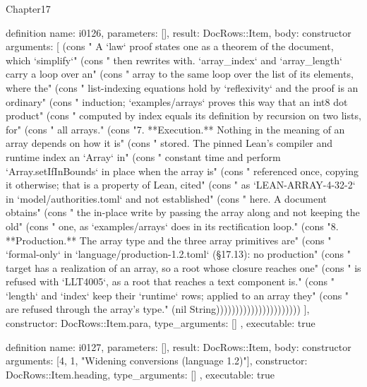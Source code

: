 \begin{lexlean}{Chapter17}
\begin{semanticmodule}
definition{
  name: i0126,
  parameters: [],
  result: DocRows::Item,
  body: constructor{
    arguments: [
      (cons "   A `law` proof states one as a theorem of the document, which `simplify`" (cons "   then rewrites with. `array_index` and `array_length` carry a loop over an" (cons "   array to the same loop over the list of its elements, where the" (cons "   list-indexing equations hold by `reflexivity` and the proof is an ordinary" (cons "   induction; `examples/arrays` proves this way that an int8 dot product" (cons "   computed by index equals its definition by recursion on two lists, for" (cons "   all arrays." (cons "7. **Execution.** Nothing in the meaning of an array depends on how it is" (cons "   stored. The pinned Lean's compiler and runtime index an `Array` in" (cons "   constant time and perform `Array.setIfInBounds` in place when the array is" (cons "   referenced once, copying it otherwise; that is a property of Lean, cited" (cons "   as `LEAN-ARRAY-4-32-2` in `model/authorities.toml` and not established" (cons "   here. A document obtains" (cons "   the in-place write by passing the array along and not keeping the old" (cons "   one, as `examples/arrays` does in its rectification loop." (cons "8. **Production.** The array type and the three array primitives are" (cons "   `formal-only` in `language/production-1.2.toml` (§17.13): no production" (cons "   target has a realization of an array, so a root whose closure reaches one" (cons "   is refused with `LLT4005`, as a root that reaches a text component is." (cons "   `length` and `index` keep their `runtime` rows; applied to an array they" (cons "   are refused through the array's type." (nil String))))))))))))))))))))))
    ],
    constructor: DocRows::Item.para,
    type_arguments: []
  },
  executable: true
}

definition{
  name: i0127,
  parameters: [],
  result: DocRows::Item,
  body: constructor{
    arguments: [4, 1, "Widening conversions (language 1.2)"],
    constructor: DocRows::Item.heading,
    type_arguments: []
  },
  executable: true
}


\end{semanticmodule}
\end{lexlean}
